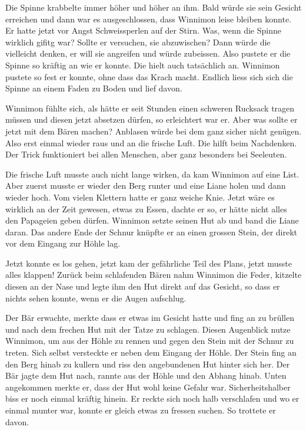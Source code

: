 Die Spinne krabbelte immer höher und höher an ihm. Bald würde sie sein Gesicht
erreichen und dann war es ausgeschlossen, dass Winnimon leise bleiben konnte.
Er hatte jetzt vor Angst Schweissperlen auf der Stirn. Was, wenn die Spinne
wirklich gifitg war? Sollte er versuchen, sie abzuwischen? Dann würde die
vielleicht denken, er will sie angreifen und würde zubeissen. Also pustete er die Spinne so kräftig an wie er konnte. Die hielt auch tatsächlich an. Winnimon pustete so fest er konnte, ohne dass das Krach macht. Endlich liess sich sich die Spinne an einem Faden zu Boden und lief davon.

Winnimon fühlte sich, als hätte er seit Stunden einen schweren Rucksack tragen müssen und diesen jetzt absetzen dürfen, so erleichtert war er. Aber was sollte er jetzt mit dem Bären machen? Anblasen würde bei dem ganz sicher nicht genügen. Also erst einmal wieder raus und an die frische Luft. Die hilft beim Nachdenken. Der Trick funktioniert bei allen Menschen, aber ganz besonders bei Seeleuten.

Die frische Luft musste auch nicht lange wirken, da kam Winnimon auf eine List. Aber zuerst musste er wieder den Berg runter und eine Liane holen und dann wieder hoch. Vom vielen Klettern hatte er ganz weiche Knie. Jetzt wäre es wirklich an der Zeit gewesen, etwas zu Essen, dachte er so, er hätte nicht alles den Papageien geben dürfen. Winnimon setzte seinen Hut ab und band die Liane daran. Das andere Ende der Schnur knüpfte er an einen grossen Stein, der direkt vor dem Eingang zur Höhle lag.

Jetzt konnte es los gehen, jetzt kam der gefährliche Teil des Plans, jetzt musste alles klappen! Zurück beim schlafenden Bären nahm Winnimon die Feder, kitzelte diesen an der Nase und legte ihm den Hut direkt auf das Gesicht, so dass er nichts sehen konnte, wenn er die Augen aufschlug.

Der Bär erwachte, merkte dass er etwas im Gesicht hatte und fing an zu brüllen und nach dem frechen Hut mit der Tatze zu schlagen. Diesen Augenblick nutze Winnimon, um aus der Höhle zu rennen und gegen den Stein mit der Schnur zu treten. Sich selbst versteckte er neben dem Eingang der Höhle. Der Stein fing an den Berg hinab zu kullern und riss den angebundenen Hut hinter sich her. Der Bär jagte dem Hut nach, rannte aus der Höhle und den Abhang hinab. Unten angekommen merkte er, dass der Hut wohl keine Gefahr war. Sicherheitshalber biss er noch einmal kräftig hinein. Er reckte sich noch halb verschlafen und wo er einmal munter war, konnte er gleich etwas zu fressen suchen. So trottete er davon.

